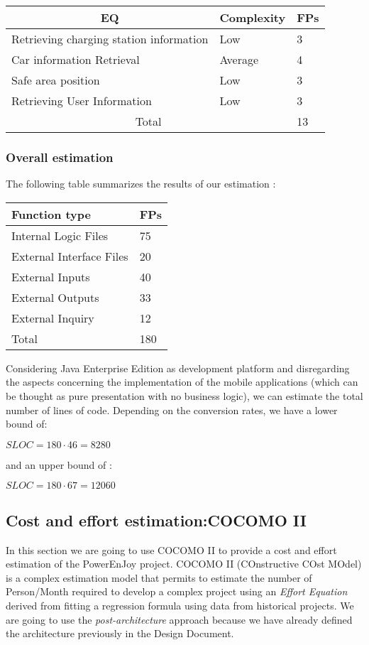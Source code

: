 \begin{center}
\begin{tabular}{|l l l|}
\hline
\multicolumn{1}{|c}{EQ}&Complexity&FPs\\
\hline
Retrieving charging station information &Low &3\\
Car information Retrieval & Average & 4\\
Safe area position &Low&3\\
Retrieving User Information &  Low&3\\\hline
\multicolumn{2}{|c}{Total}&13\\
\hline
\end{tabular}
\end{center}
\subsubsection{Overall estimation}
The following table summarizes the results of our estimation :
\begin{center}
\begin{tabular}{|l l|}
\hline
Function type&FPs\\
\hline
Internal Logic Files &75\\
External Interface Files & 20\\
External Inputs&40\\
External Outputs&33\\
External Inquiry&12\\\hline
Total&180\\
\hline
\end{tabular}
\end{center}
Considering Java Enterprise Edition as development platform and disregarding the aspects concerning the implementation of the mobile applications (which can be thought as pure presentation with no business logic), we can estimate the total number of lines of code.
Depending on the conversion rates, we have a lower bound of:
\begin{center}
$SLOC = 180 \cdot 46 = 8280$
\end{center}
and an upper bound of :
\begin{center}
$SLOC = 180 \cdot 67 = 12060$
\end{center}
\subsection{Cost and effort estimation:COCOMO II}
In this section we are going to use COCOMO II to provide a cost and effort estimation of the PowerEnJoy project.
COCOMO II (COnstructive COst MOdel) is a complex estimation
model that permits to estimate the number of Person/Month required to develop a complex project using an\textit{ Effort Equation} derived from fitting a regression formula using data from historical projects.
We are going to use the \textit{post-architecture} approach because we have already defined the architecture previously in the Design Document.

